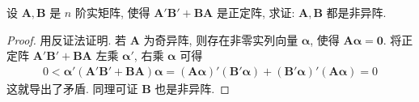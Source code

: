 \documentclass[../../main.tex]{subfiles}%
\begin{document}
\begin{proposition}\label{proposition:两个正定阵和非异阵的关系}
设 \(\boldsymbol{A},\boldsymbol{B}\) 是 \(n\) 阶实矩阵, 使得 \(\boldsymbol{A}'\boldsymbol{B}'+\boldsymbol{B}\boldsymbol{A}\) 是正定阵, 求证: \(\boldsymbol{A},\boldsymbol{B}\) 都是非异阵.
\end{proposition}
\begin{proof}

用反证法证明. 若 \(\boldsymbol{A}\) 为奇异阵, 则存在非零实列向量 \(\boldsymbol{\alpha}\), 使得 \(\boldsymbol{A}\boldsymbol{\alpha}=\boldsymbol{0}\). 将正定阵 \(\boldsymbol{A}'\boldsymbol{B}'+\boldsymbol{B}\boldsymbol{A}\) 左乘 \(\boldsymbol{\alpha}'\), 右乘 \(\boldsymbol{\alpha}\) 可得
\begin{align*}
0<\boldsymbol{\alpha}'(\boldsymbol{A}'\boldsymbol{B}'+\boldsymbol{B}\boldsymbol{A})\boldsymbol{\alpha}=(\boldsymbol{A}\boldsymbol{\alpha})'(\boldsymbol{B}'\boldsymbol{\alpha})+(\boldsymbol{B}'\boldsymbol{\alpha})'(\boldsymbol{A}\boldsymbol{\alpha})= 0
\end{align*}
这就导出了矛盾. 同理可证 \(\boldsymbol{B}\) 也是非异阵. 

\end{proof}
\end{document}

